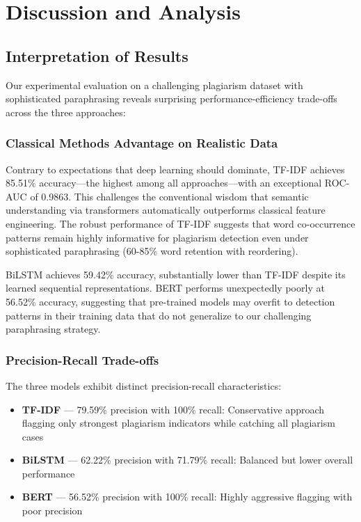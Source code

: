 \section{Discussion and Analysis} \label{sec:discussion}

\subsection{Interpretation of Results}

Our experimental evaluation on a challenging plagiarism dataset with sophisticated paraphrasing reveals surprising performance-efficiency trade-offs across the three approaches:

\subsubsection{Classical Methods Advantage on Realistic Data}

Contrary to expectations that deep learning should dominate, TF-IDF achieves 85.51\% accuracy—the highest among all approaches—with an exceptional ROC-AUC of 0.9863. This challenges the conventional wisdom that semantic understanding via transformers automatically outperforms classical feature engineering. The robust performance of TF-IDF suggests that word co-occurrence patterns remain highly informative for plagiarism detection even under sophisticated paraphrasing (60-85\% word retention with reordering).

BiLSTM achieves 59.42\% accuracy, substantially lower than TF-IDF despite its learned sequential representations. BERT performs unexpectedly poorly at 56.52\% accuracy, suggesting that pre-trained models may overfit to detection patterns in their training data that do not generalize to our challenging paraphrasing strategy.

\subsubsection{Precision-Recall Trade-offs}

The three models exhibit distinct precision-recall characteristics:

\begin{itemize}
  \item \textbf{TF-IDF} --- 79.59\% precision with 100\% recall: Conservative approach flagging only strongest plagiarism indicators while catching all plagiarism cases
  \item \textbf{BiLSTM} --- 62.22\% precision with 71.79\% recall: Balanced but lower overall performance
  \item \textbf{BERT} --- 56.52\% precision with 100\% recall: Highly aggressive flagging with poor precision
\end{itemize}

